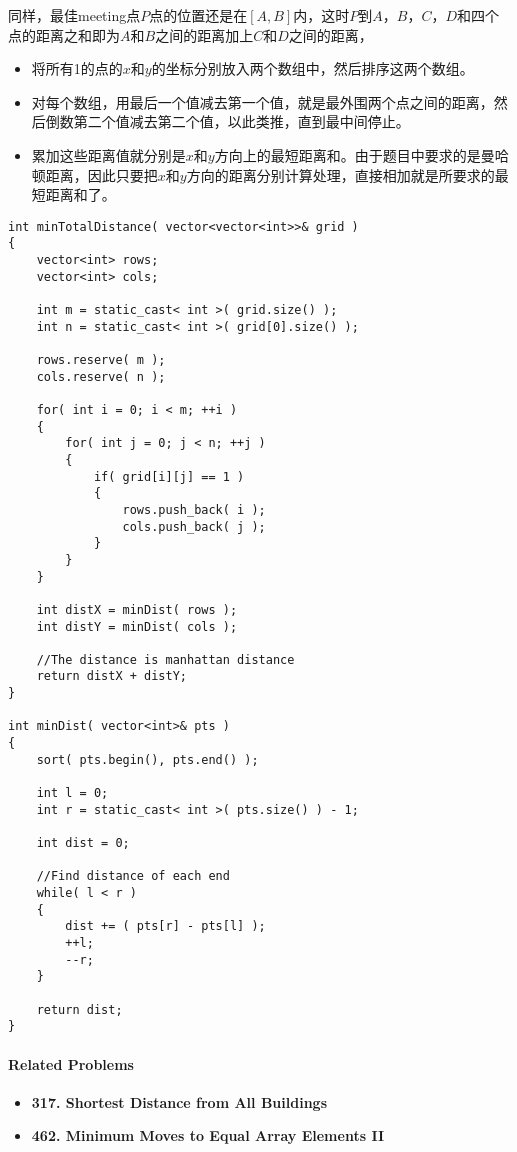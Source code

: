 \begin{figure}[H]
\end{figure}
同样，最佳meeting点$P$点的位置还是在$[A, B]$内，这时$P$到$A$，$B$，$C$，$D$和四个点的距离之和即为$A$和$B$之间的距离加上$C$和$D$之间的距离，
\par
\begin{itemize}
    \item 将所有1的点的$x$和$y$的坐标分别放入两个数组中，然后排序这两个数组。
    \item 对每个数组，用最后一个值减去第一个值，就是最外围两个点之间的距离，然后倒数第二个值减去第二个值，以此类推，直到最中间停止。
    \item 累加这些距离值就分别是$x$和$y$方向上的最短距离和。由于题目中要求的是曼哈顿距离，因此只要把$x$和$y$方向的距离分别计算处理，直接相加就是所要求的最短距离和了。
\end{itemize}
\setcounter{lstlisting}{0}
\begin{lstlisting}[style=customc, caption={Sorting}]
int minTotalDistance( vector<vector<int>>& grid )
{
    vector<int> rows;
    vector<int> cols;

    int m = static_cast< int >( grid.size() );
    int n = static_cast< int >( grid[0].size() );

    rows.reserve( m );
    cols.reserve( n );

    for( int i = 0; i < m; ++i )
    {
        for( int j = 0; j < n; ++j )
        {
            if( grid[i][j] == 1 )
            {
                rows.push_back( i );
                cols.push_back( j );
            }
        }
    }

    int distX = minDist( rows );
    int distY = minDist( cols );

    //The distance is manhattan distance
    return distX + distY;
}

int minDist( vector<int>& pts )
{
    sort( pts.begin(), pts.end() );

    int l = 0;
    int r = static_cast< int >( pts.size() ) - 1;

    int dist = 0;

    //Find distance of each end
    while( l < r )
    {
        dist += ( pts[r] - pts[l] );
        ++l;
        --r;
    }

    return dist;
}
\end{lstlisting}

\paragraph{Related Problems}
\begin{itemize}
\item \textbf{317. Shortest Distance from All Buildings}
\item \textbf{462. Minimum Moves to Equal Array Elements II}
\end{itemize}